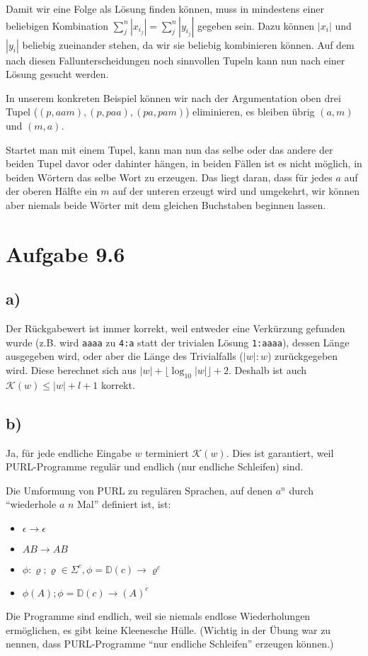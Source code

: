 \documentclass{article}
\begin{document}
Damit wir eine Folge als Lösung finden können, muss in mindestens einer beliebigen Kombination $\sum_j^n |x_{i_j}| = \sum_j^n |y_{i_j}|$ gegeben sein. Dazu können $|x_i|$ und $|y_i|$ beliebig zueinander stehen, da wir sie beliebig kombinieren können. Auf dem nach diesen Fallunterscheidungen noch sinnvollen Tupeln kann nun nach einer Lösung gesucht werden.

In unserem konkreten Beispiel können wir nach der Argumentation oben drei Tupel ($(p,aam),(p,paa),(pa,pam)$) eliminieren, es bleiben übrig $(a,m)$ und $(m,a)$. 

Startet man mit einem Tupel, kann man nun das selbe oder das andere der beiden Tupel davor oder dahinter hängen, in beiden Fällen ist es nicht möglich, in beiden Wörtern das selbe Wort zu erzeugen. Das liegt daran, dass für jedes $a$ auf der oberen Hälfte ein $m$ auf der unteren erzeugt wird und umgekehrt, wir können aber niemals beide Wörter mit dem gleichen Buchstaben beginnen lassen.



\section*{Aufgabe 9.6}

\subsection*{a)}
Der Rückgabewert ist immer korrekt, weil entweder eine Verkürzung gefunden wurde (z.B. wird \texttt{aaaa} zu \texttt{4:a} statt der trivialen Lösung \texttt{1:aaaa}), dessen Länge ausgegeben wird, oder aber die Länge des Trivialfalls ($|w|:w$) zurückgegeben wird. Diese berechnet sich aus $|w|+\lfloor \log_10 |w| \rfloor + 2$. Deshalb ist auch $\mathcal{K}(w)\leq |w|+l+1$ korrekt.

\subsection*{b)}
Ja, für jede endliche Eingabe $w$ terminiert $\mathcal{K}(w)$. Dies ist garantiert, weil PURL-Programme regulär und endlich (nur endliche Schleifen) sind.

Die Umformung von PURL zu regulären Sprachen, auf denen $a^n$ durch "`wiederhole $a$ $n$ Mal"' definiert ist, ist:
\begin{itemize}\itemsep0em
	\item $\epsilon \rightarrow \epsilon$
  \item $AB \rightarrow AB$
  \item $\phi\!:\!\varrho; \varrho \in \Sigma^c, \phi=\mathbb{D}(c) \rightarrow \varrho^c$
  \item $\phi(A); \phi=\mathbb{D}(c) \rightarrow (A)^c$
\end{itemize}
Die Programme sind endlich, weil sie niemals endlose Wiederholungen ermöglichen, es gibt keine Kleenesche Hülle. (Wichtig in der Übung war zu nennen, dass PURL-Programme "`nur endliche Schleifen"' erzeugen können.)
\end{document}
